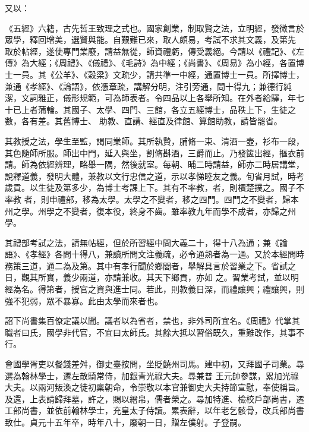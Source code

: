 \begin{pinyinscope}
 又以：



 《五經》六籍，古先哲王致理之式也。國家創業，制取賢之法，立明經，發微言於眾學，釋回增美，選賢與能。自艱難已來，取人頗易，考試不求其文義，及第先
 取於帖經，遂使專門業廢，請益無從，師資禮虧，傳受義絕。今請以《禮記》、《左傳》為大經；《周禮》、《儀禮》、《毛詩》為中經；《尚書》、《周易》為小經，各置博士一員。其《公羊》、《穀梁》文疏少，請共準一中經，通置博士一員。所擇博士，兼通《孝經》、《論語》，依憑章疏，講解分明，注引旁通，問十得九；兼德行純潔，文詞雅正，儀形規範，可為師表者。令四品以上各舉所知。在外者給驛，年七十已上者蒲輪。其國子、太學、四門、三館，各立五經博士，品秩上下，生徒之數，各有差。其舊博士、
 助教、直講、經直及律館、算館助教，請皆罷省。



 其教授之法，學生至監，謁同業師。其所執贄，脯脩一束、清酒一壺，衫布一段，其色隨師所服。師出中門，延入與坐，割脩斟酒，三爵而止。乃發篋出經，摳衣前請。師為依經辨理，略舉一隅，然後就室。每朝、晡二時請益，師亦二時居講堂，說釋道義，發明大體，兼教以文行忠信之道，示以孝悌睦友之義。旬省月試，時考歲貢。以生徒及第多少，為博士考課上下。其有不率教，者，則檟楚撲之。國子不率教
 者，則申禮部，移為太學。太學之不變者，移之四門。四門之不變者，歸本州之學。州學之不變者，復本役，終身不齒。雖率教九年而學不成者，亦歸之州學。



 其禮部考試之法，請無帖經，但於所習經中問大義二十，得十八為通；兼《論語》、《孝經》各問十得八，兼讀所問文注義疏，必令通熟者為一通。又於本經問時務策三道，通二為及第。其中有孝行聞於鄉閭者，舉解具言於習業之下。省試之日，觀其所實，義少兩道，亦請兼收。其天下鄉貢，亦如
 之。習業考試，並以明經為名。得第者，授官之資與進士同。若此，則教義日深，而禮讓興；禮讓興，則強不犯弱，眾不暴寡。此由太學而來者也。



 詔下尚書集百僚定議以聞。議者以為省者，禁也，非外司所宜名。《周禮》代掌其職者曰氏，國學非代官，不宜曰太師氏。其餘大抵以習俗既久，重難改作，其事不行。



 會國學胥吏以餐錢差舛，御史臺按問，坐貶饒州司馬。建中初，又拜國子司業。尋選為翰林學士，遷左散騎常侍，加銀青光祿大夫。尋兼普
 王元帥參謀，累加光祿大夫。以兩河叛渙之徒初稟朝命，令崇敬以本官兼御史大夫持節宣慰，奉使稱旨。及還，上表請歸拜墓，許之，賜以繒帛，儒者榮之。尋加特進、檢校戶部尚書，遷工部尚書，並依前翰林學士，充皇太子侍讀。累表辭，以年老乞骸骨，改兵部尚書致仕。貞元十五年卒，時年八十，廢朝一日，贈左僕射。子登嗣。




\end{pinyinscope}
